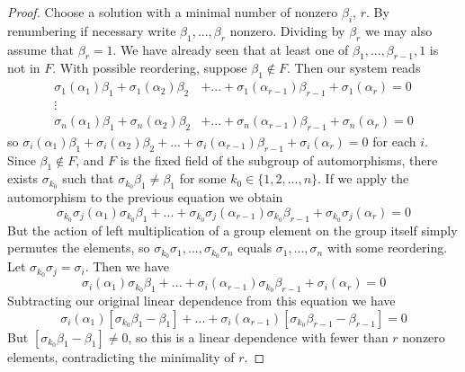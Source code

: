 \documentclass[12pt, a4paper, oneside, openright, titlepage]{book}
\begin{document}
\begin{proof}
    Choose a solution with a minimal number of nonzero $\beta_i$, $r$. By renumbering if necessary write $\beta_1,...,\beta_r$ nonzero. Dividing by $\beta_r$ we may also assume that $\beta_r = 1$. We have already seen that at least one of $\beta_1,...,\beta_{r-1},1$ is not in $F$. With possible reordering, suppose $\beta_1 \notin F$. Then our system reads
    \begin{align*}
        \sigma_1(\alpha_1)\beta_1 + \sigma_1(\alpha_2)\beta_2&+...+\sigma_1(\alpha_{r-1})\beta_{r-1}+\sigma_1(\alpha_r) = 0 \\
        \vdots& \\
        \sigma_n(\alpha_1)\beta_1 + \sigma_n(\alpha_2)\beta_2&+...+\sigma_n(\alpha_{r-1})\beta_{r-1}+\sigma_n(\alpha_r)= 0 
    \end{align*}
    so $\sigma_i(\alpha_1)\beta_1 + \sigma_i(\alpha_2)\beta_2+...+\sigma_i(\alpha_{r-1})\beta_{r-1}+\sigma_i(\alpha_r) = 0$ for each $i$. Since $\beta_1 \notin F$, and $F$ is the fixed field of the subgroup of automorphisms, there exists $\sigma_{k_0}$ such that $\sigma_{k_0}\beta_1 \neq \beta_1$ for some $k_0 \in \{1,2,...,n\}$. If we apply the automorphism to the previous equation we obtain \begin{equation*}
        \sigma_{k_0}\sigma_j(\alpha_1)\sigma_{k_0}\beta_1 +...+\sigma_{k_0}\sigma_j(\alpha_{r-1})\sigma_{k_0}\beta_{r-1}+\sigma_{k_0}\sigma_j(\alpha_r) = 0
    \end{equation*}
    But the action of left multiplication of a group element on the group itself simply permutes the elements, so $\sigma_{k_0}\sigma_1,...,\sigma_{k_0}\sigma_n$ equals $\sigma_1,...,\sigma_n$ with some reordering. Let $\sigma_{k_0}\sigma_j = \sigma_i$. Then we have \begin{equation*}
        \sigma_i(\alpha_1)\sigma_{k_0}\beta_1 +...+\sigma_i(\alpha_{r-1})\sigma_{k_0}\beta_{r-1}+\sigma_i(\alpha_r) = 0
    \end{equation*}
    Subtracting our original linear dependence from this equation we have \begin{equation*}
        \sigma_i(\alpha_1)[\sigma_{k_0}\beta_1-\beta_1] +...+\sigma_i(\alpha_{r-1})[\sigma_{k_0}\beta_{r-1}-\beta_{r-1}]= 0
    \end{equation*}
    But $[\sigma_{k_0}\beta_1 - \beta_1] \neq 0$, so this is a linear dependence with fewer than $r$ nonzero elements, contradicting the minimality of $r$.
\end{proof}
\end{document}
